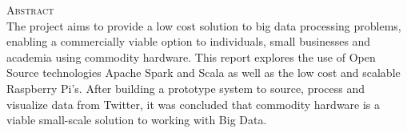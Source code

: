 \documentclass[12pt]{article} %
\begin{document}
				\begin{figure}[H] %
					\label{fig:speciation}
				\end{figure}
		
		
		\newpage
		
		\begin{flushleft}\large
			\textsc{Abstract}\\
			The project aims to provide a low cost solution to big data processing problems, enabling a commercially viable option to individuals, small businesses and academia using commodity hardware. This report explores the use of  Open Source technologies Apache Spark and Scala as well as the low cost and scalable Raspberry Pi's. After building a prototype system to source, process and visualize data from Twitter, it was concluded that  commodity hardware is a viable small-scale solution to working with Big Data.
			
		\end{flushleft}
	
\end{document}
